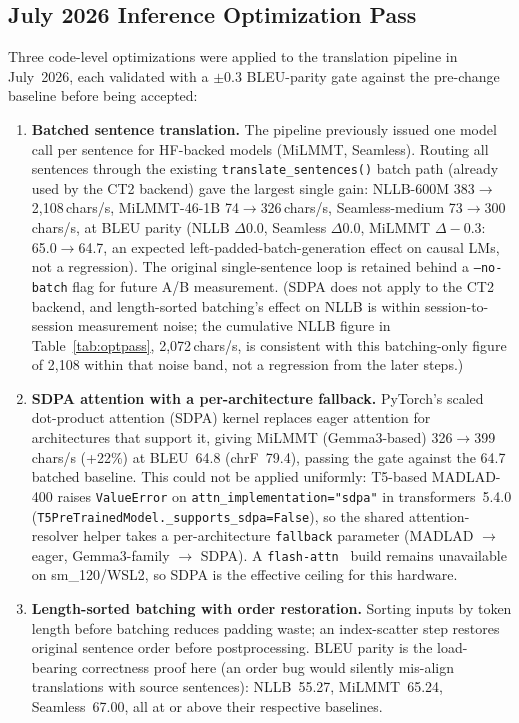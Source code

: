 \documentclass[conference]{IEEEtran}
\newcommand{\NLLBBEFORECHS}{383}
\begin{document}
\subsection{July 2026 Inference Optimization Pass}
\label{sec:optpass}

Three code-level optimizations were applied to the translation pipeline in
July~2026, each validated with a $\pm$0.3 BLEU-parity gate against the
pre-change baseline before being accepted:

\begin{enumerate}
  \item \textbf{Batched sentence translation.} The pipeline previously issued one
        model call per sentence for HF-backed models (MiLMMT, Seamless). Routing all
        sentences through the existing \texttt{translate\_sentences()} batch path
        (already used by the CT2 backend) gave the largest single gain: NLLB-600M
        \NLLBBEFORECHS{}$\to$2{,}108\,chars/s, MiLMMT-46-1B 74$\to$326\,chars/s,
        Seamless-medium 73$\to$300\,chars/s, at BLEU parity (NLLB $\Delta$0.0,
        Seamless $\Delta$0.0, MiLMMT $\Delta{-}$0.3: 65.0$\to$64.7, an expected
        left-padded-batch-generation effect on causal LMs, not a regression). The
        original single-sentence loop is retained behind a \texttt{--no-batch} flag
        for future A/B measurement. (SDPA does not apply to the CT2 backend, and
        length-sorted batching's effect on NLLB is within session-to-session
        measurement noise; the cumulative NLLB figure in Table~\ref{tab:optpass},
        2{,}072\,chars/s, is consistent with this batching-only figure of 2{,}108
        within that noise band, not a regression from the later steps.)

  \item \textbf{SDPA attention with a per-architecture fallback.} PyTorch's scaled
        dot-product attention (SDPA) kernel replaces eager attention for
        architectures that support it, giving MiLMMT (Gemma3-based)
        326$\to$399\,chars/s (+22\%) at BLEU~64.8 (chrF~79.4), passing the gate
        against the 64.7 batched baseline. This could not be applied uniformly:
        T5-based MADLAD-400 raises \texttt{ValueError} on
        \texttt{attn\_implementation="sdpa"} in transformers~5.4.0
        (\texttt{T5PreTrainedModel.\_supports\_sdpa=False}), so the shared
        attention-resolver helper takes a per-architecture \texttt{fallback}
        parameter (MADLAD $\to$ eager, Gemma3-family $\to$ SDPA). A
        \texttt{flash-attn}~\cite{dao2022flashattention} build remains unavailable
        on sm\_120/WSL2, so SDPA is the effective ceiling for this hardware.

  \item \textbf{Length-sorted batching with order restoration.} Sorting inputs by
        token length before batching reduces padding waste; an index-scatter step
        restores original sentence order before postprocessing. BLEU parity is the
        load-bearing correctness proof here (an order bug would silently mis-align
        translations with source sentences): NLLB~55.27, MiLMMT~65.24, Seamless~67.00,
        all at or above their respective baselines.
\end{enumerate}
\end{document}
